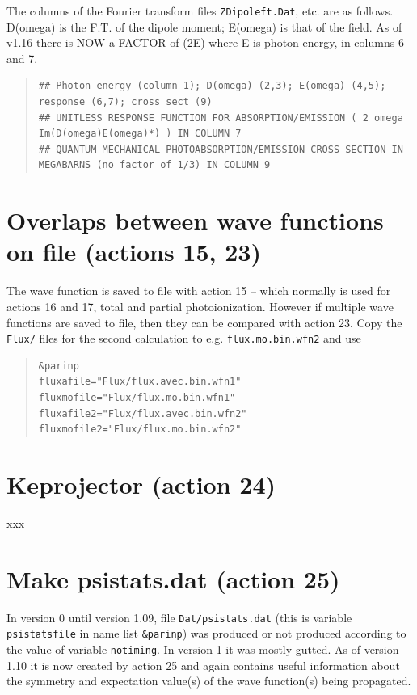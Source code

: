 \documentclass[10pt,leqno, oneside]{book}
\begin{document}
The columns of the Fourier transform files \verb#ZDipoleft.Dat#, etc. are as follows.  D(omega) is the F.T. of the dipole moment;
E(omega) is that of the field.  As of v1.16 there is NOW a FACTOR of (2E) where E is photon energy, in columns 6 and 7.

\begin{quote}
{\footnotesize
\begin{verbatim}
## Photon energy (column 1); D(omega) (2,3); E(omega) (4,5); response (6,7); cross sect (9) 
## UNITLESS RESPONSE FUNCTION FOR ABSORPTION/EMISSION ( 2 omega Im(D(omega)E(omega)*) ) IN COLUMN 7 
## QUANTUM MECHANICAL PHOTOABSORPTION/EMISSION CROSS SECTION IN MEGABARNS (no factor of 1/3) IN COLUMN 9 
\end{verbatim}
}
\end{quote}



\section{Overlaps between wave functions on file (actions 15, 23)}

The wave function is saved to file with action 15 -- which normally is used for actions 16 and 17, total and partial photoionization.
However if multiple wave functions are saved to file, then they can be compared with action 23.  Copy the \verb#Flux/# files for the second
calculation to e.g. \verb#flux.mo.bin.wfn2# and use
\begin{quote}
{\footnotesize
\begin{verbatim}
&parinp
fluxafile="Flux/flux.avec.bin.wfn1"
fluxmofile="Flux/flux.mo.bin.wfn1"
fluxafile2="Flux/flux.avec.bin.wfn2"
fluxmofile2="Flux/flux.mo.bin.wfn2"
\end{verbatim}
}
\end{quote}

\section{Keprojector (action 24)}

xxx


\section{Make psistats.dat (action 25)}

In version 0 until version 1.09, file \verb#Dat/psistats.dat# (this is variable \verb#psistatsfile# in name list \verb#&parinp#) was produced or not produced
according to the value of variable \verb#notiming#.  In version 1 it was mostly gutted.  As of version 1.10 it is now created by action 25 and again
contains useful information about the symmetry and expectation value(s) of the wave function(s) being propagated.  
\end{document}
